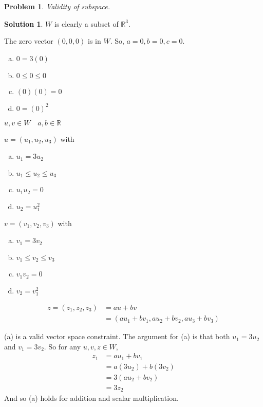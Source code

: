 \documentclass{article}
\newtheorem{problem}{Problem}
\theoremstyle{definition}
\newtheorem*{solution}{Solution}
\begin{document}
\begin{problem} 

Validity of subspace.

\end{problem}

\begin{solution}

$W$ is clearly a subset of $\mathbb{R}^3$.

The zero vector $(0,0,0)$ is in $W$.
So, $a=0,b=0,c=0$.
\begin{enumerate}[a)]
 \item $0=3(0)$
 \item $0\leq 0\leq 0$
 \item $(0)(0)=0$
 \item $0=(0)^2$
\end{enumerate}

$u,v\in W\quad a,b\in \mathbb{R}$

\begin{multicols}{2}
$u=(u_1,u_2,u_3)$ with 
\begin{enumerate}[a)]
 \item $u_1=3u_2$
 \item $u_1\leq u_2\leq u_3$
 \item $u_1u_2=0$
 \item $u_2=u_1^2$
\end{enumerate}

$v=(v_1,v_2,v_3)$ with 
\begin{enumerate}[a)]
 \item $v_1=3v_2$
 \item $v_1\leq v_2\leq v_3$
 \item $v_1v_2=0$
 \item $v_2=v_1^2$
\end{enumerate}
\end{multicols}

\begin{align*}
z=(z_1,z_2,z_3)&=au+bv \\
&=(au_1+bv_1,au_2+bv_2,au_3+bv_3)
\end{align*}

(a) is a valid vector space constraint.
The argument for (a) is that both $u_1=3u_2$ and $v_1=3v_2$.
So for any $u,v,z\in W$,
\begin{align*}
z_1&=au_1+bv_1\\
&=a(3u_2)+b(3v_2)\\
&=3(au_2+bv_2)\\
&=3z_2
\end{align*}
And so (a) holds for addition and scalar multiplication.


\end{solution}
\end{document}
